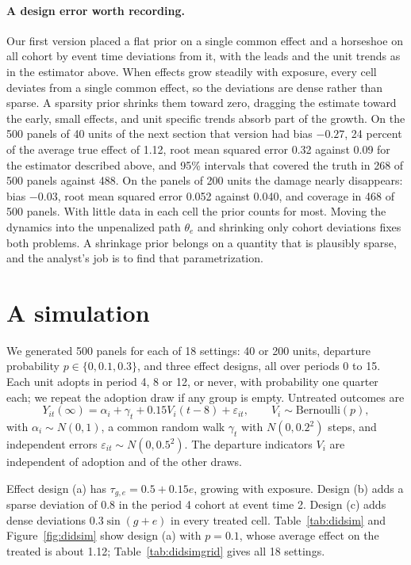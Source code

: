 \paragraph{A design error worth recording.} Our first version placed a flat prior on a single common effect and a horseshoe on all cohort by event time deviations from it, with the leads and the unit trends as in the estimator above. When effects grow steadily with exposure, every cell deviates from a single common effect, so the deviations are dense rather than sparse. A sparsity prior shrinks them toward zero, dragging the estimate toward the early, small effects, and unit specific trends absorb part of the growth. On the 500 panels of 40 units of the next section that version had bias $-0.27$, 24 percent of the average true effect of 1.12, root mean squared error 0.32 against 0.09 for the estimator described above, and 95\% intervals that covered the truth in 268 of 500 panels against 488. On the panels of 200 units the damage nearly disappears: bias $-0.03$, root mean squared error 0.052 against 0.040, and coverage in 468 of 500 panels. With little data in each cell the prior counts for most. Moving the dynamics into the unpenalized path $\theta_e$ and shrinking only cohort deviations fixes both problems. A shrinkage prior belongs on a quantity that is plausibly sparse, and the analyst's job is to find that parametrization.

\section{A simulation}

We generated 500 panels for each of 18 settings: 40 or 200 units, departure probability $p\in\{0,0.1,0.3\}$, and three effect designs, all over periods 0 to 15. Each unit adopts in period 4, 8 or 12, or never, with probability one quarter each; we repeat the adoption draw if any group is empty. Untreated outcomes are
\[
Y_{it}(\infty)=\alpha_i+\gamma_t+0.15V_i(t-8)+\varepsilon_{it},\qquad V_i\sim\mathrm{Bernoulli}(p),
\]
with $\alpha_i\sim N(0,1)$, a common random walk $\gamma_t$ with $N(0,0.2^2)$ steps, and independent errors $\varepsilon_{it}\sim N(0,0.5^2)$. The departure indicators $V_i$ are independent of adoption and of the other draws.

Effect design (a) has $\tau_{g,e}=0.5+0.15e$, growing with exposure. Design (b) adds a sparse deviation of 0.8 in the period 4 cohort at event time 2. Design (c) adds dense deviations $0.3\sin(g+e)$ in every treated cell. Table~\ref{tab:didsim} and Figure~\ref{fig:didsim} show design (a) with $p=0.1$, whose average effect on the treated is about 1.12; Table~\ref{tab:didsimgrid} gives all 18 settings.


